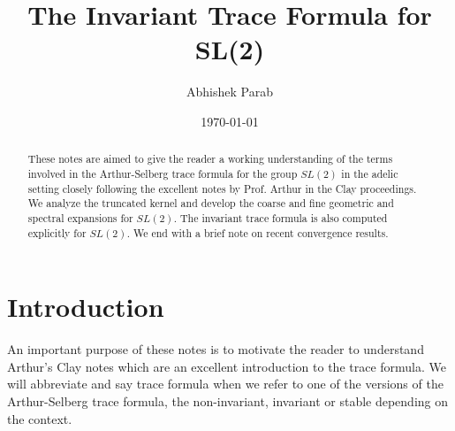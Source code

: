 \documentclass[11pt]{amsart}
\theoremstyle{remark}
\begin{document}
\title{The Invariant Trace Formula for SL(2)}
\author{Abhishek Parab}
\date{\today}                       %

\maketitle
\setcounter{tocdepth}{1}		%

\begin{abstract}
	These notes are aimed to give the reader a working understanding of the terms involved in the Arthur-Selberg trace formula for the group $SL(2)$ in the adelic setting closely following the excellent notes \cite{clay} by Prof. Arthur in the Clay proceedings. We analyze the truncated kernel and develop the coarse and fine geometric and spectral expansions for $SL(2)$. The invariant trace formula is also computed explicitly for $SL(2)$. We end with a brief note on recent convergence results. 
\end{abstract}

\tableofcontents

\section{Introduction} \label{sec_intro}
	
	An important purpose of these notes is to motivate the reader to understand Arthur's Clay notes \cite{clay} which are an excellent introduction to the trace formula. We will abbreviate and say trace formula when we refer to one of the versions of the Arthur-Selberg trace formula, the non-invariant, invariant or stable depending on the context. 
	
\end{document}
